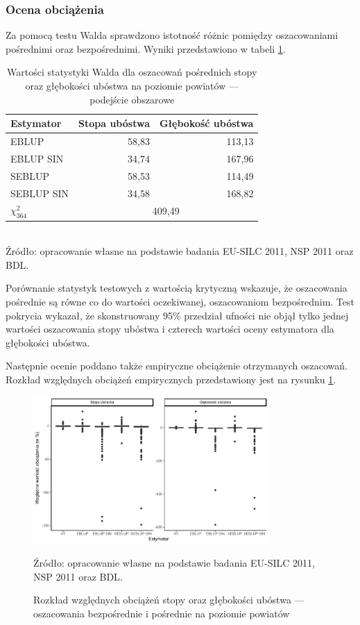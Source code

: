 \subsubsection{Ocena obciążenia}

Za pomocą testu Walda sprawdzono istotność różnic pomiędzy oszacowaniami pośrednimi oraz bezpośrednimi. Wyniki przedstawiono w tabeli \ref{tab:wald_pow}.

\begin{table}[htp]
\caption{Wartości statystyki Walda dla oszacowań pośrednich stopy oraz głębokości ubóstwa na poziomie powiatów --- podejście obszarowe}
\label{tab:wald_pow}
\centering
\begin{tabular}{lrr}
\hline
Estymator & Stopa ubóstwa & Głębokość ubóstwa\tabularnewline
\hline
EBLUP & 58,83 & 113,13\tabularnewline
EBLUP SIN & 34,74 & 167,96\tabularnewline
SEBLUP & 58,53 & 114,49\tabularnewline
SEBLUP SIN & 34,58 & 168,82\tabularnewline
\hline
$\chi^2_{364}$ & \multicolumn{2}{c}{409,49}\tabularnewline
\hline
\end{tabular}\\
\small{Źródło: opracowanie własne na podstawie badania EU-SILC 2011, NSP 2011 oraz BDL.}
\end{table}

Porównanie statystyk testowych z wartością krytyczną wskazuje, że oszacowania pośrednie są równe co do wartości oczekiwanej, oszacowaniom bezpośrednim. Test pokrycia wykazał, że skonstruowany 95\% przedział ufności nie objął tylko jednej wartości oszacowania stopy ubóstwa i czterech wartości oceny estymatora dla głębokości ubóstwa. 

Następnie ocenie poddano także empiryczne obciążenie otrzymanych oszacowań. Rozkład względnych obciążeń empirycznych przedstawiony jest na rysunku \ref{fig:fh_pow_bias}.

\begin{figure}[htp]
\centering
\includegraphics[width=0.8\textwidth]{04_wykresy/fh_pow_bias-1.pdf}
\caption{Rozkład względnych obciążeń stopy oraz głębokości ubóstwa --- oszacowania bezpośrednie i pośrednie na poziomie powiatów}
\small{Źródło: opracowanie własne na podstawie badania EU-SILC 2011, NSP 2011 oraz BDL.}
\label{fig:fh_pow_bias}
\end{figure}

